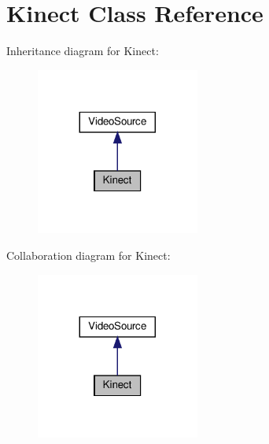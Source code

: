 \section{Kinect Class Reference}
\label{class_kinect}


Inheritance diagram for Kinect\+:
\nopagebreak
\begin{figure}[H]
\begin{center}
\leavevmode
\includegraphics[width=152pt]{class_kinect__inherit__graph}
\end{center}
\end{figure}


Collaboration diagram for Kinect\+:
\nopagebreak
\begin{figure}[H]
\begin{center}
\leavevmode
\includegraphics[width=152pt]{class_kinect__coll__graph}
\end{center}
\end{figure}
